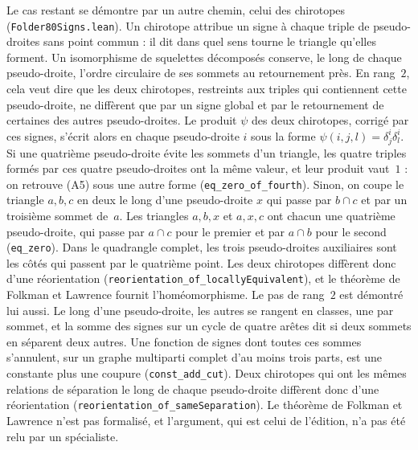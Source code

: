 {\small Le cas restant se démontre par un autre chemin, celui des chirotopes (\texttt{Folder80Signs.lean}). Un chirotope attribue un signe à chaque triple de pseudo-droites sans point commun : il dit dans quel sens tourne le triangle qu'elles forment. Un isomorphisme de squelettes décomposés conserve, le long de chaque pseudo-droite, l'ordre circulaire de ses sommets au retournement près. En rang~$2$, cela veut dire que les deux chirotopes, restreints aux triples qui contiennent cette pseudo-droite, ne diffèrent que par un signe global et par le retournement de certaines des autres pseudo-droites. Le produit $\psi$ des deux chirotopes, corrigé par ces signes, s'écrit alors en chaque pseudo-droite $i$ sous la forme $\psi(i,j,l) = \delta^i_j\delta^i_l$. Si une quatrième pseudo-droite évite les sommets d'un triangle, les quatre triples formés par ces quatre pseudo-droites ont la même valeur, et leur produit vaut~$1$ : on retrouve (A5) sous une autre forme (\texttt{eq\_zero\_of\_fourth}). Sinon, on coupe le triangle $a, b, c$ en deux le long d'une pseudo-droite $x$ qui passe par $b \cap c$ et par un troisième sommet de~$a$. Les triangles $a, b, x$ et $a, x, c$ ont chacun une quatrième pseudo-droite, qui passe par $a \cap c$ pour le premier et par $a \cap b$ pour le second (\texttt{eq\_zero}). Dans le quadrangle complet, les trois pseudo-droites auxiliaires sont les côtés qui passent par le quatrième point. Les deux chirotopes diffèrent donc d'une réorientation (\texttt{reorientation\_of\_locallyEquivalent}), et le théorème de Folkman et Lawrence fournit l'homéomorphisme. Le pas de rang~$2$ est démontré lui aussi. Le long d'une pseudo-droite, les autres se rangent en classes, une par sommet, et la somme des signes sur un cycle de quatre arêtes dit si deux sommets en séparent deux autres. Une fonction de signes dont toutes ces sommes s'annulent, sur un graphe multiparti complet d'au moins trois parts, est une constante plus une coupure (\texttt{const\_add\_cut}). Deux chirotopes qui ont les mêmes relations de séparation le long de chaque pseudo-droite diffèrent donc d'une réorientation (\texttt{reorientation\_of\_sameSeparation}). Le théorème de Folkman et Lawrence n'est pas formalisé, et l'argument, qui est celui de l'édition, n'a pas été relu par un spécialiste.\par}

